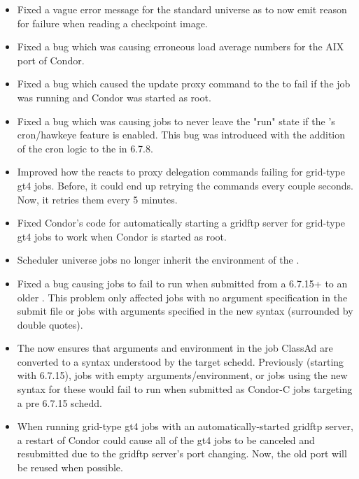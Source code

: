 \begin{itemize}
\item Fixed a vague error message for the standard universe as to now
emit reason for failure when reading a checkpoint image.

\item Fixed a bug which was causing erroneous load average numbers for
the AIX port of Condor.

\item Fixed a bug which caused the update proxy command to the
 to fail if the job was running and Condor was started
as root.

\item Fixed a bug which was causing jobs to never leave the "run"
state if the 's cron/hawkeye feature is enabled.  This
bug was introduced with the addition of the cron logic to the
 in 6.7.8.

\item Improved how the  reacts to proxy delegation
commands failing for grid-type gt4 jobs. Before, it could end up retrying
the commands every couple seconds. Now, it retries them every 5 minutes.

\item Fixed Condor's code for automatically starting a gridftp server for
grid-type gt4 jobs to work when Condor is started as root.

\item Scheduler universe jobs no longer inherit the environment of the
.

\item Fixed a bug causing jobs to fail to run when submitted from a
6.7.15+  to an older .  This problem
only affected jobs with no argument specification in the submit file
or jobs with arguments specified in the new syntax (surrounded by
double quotes).

\item The  now ensures that arguments and environment in
the job ClassAd are converted to a syntax understood by the target
schedd.  Previously (starting with 6.7.15), jobs with empty
arguments/environment, or jobs using the new syntax for these would fail
to run when submitted as Condor-C jobs targeting a pre 6.7.15 schedd.

\item When running grid-type gt4 jobs with an automatically-started
gridftp server, a restart of Condor could cause all of the gt4 jobs to
be canceled and resubmitted due to the gridftp server's port changing.
Now, the old port will be reused when possible.


\end{itemize}
